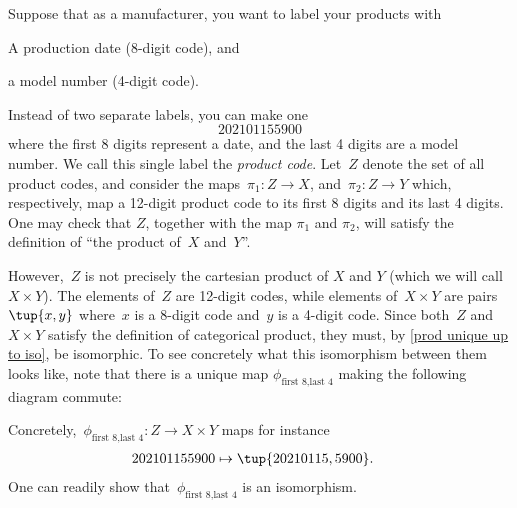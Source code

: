 \begin{example}
    \label{ex univ prop prod}
    Suppose that as a manufacturer, you want to label your products with
    \begin{compactitem}
        \item A production date (8-digit code), and
        \item a model number (4-digit code).
    \end{compactitem}
    Instead of two separate labels, you can make one
    \begin{equation*}
        202101155900
    \end{equation*}
    where the first 8 digits represent a date, and the last 4 digits are a model number.
    We call this single label the \emph{product code}. Let~$Z$ denote the set of all product codes, and consider the maps~$\pi_1\colon Z\to X$, and~$\pi_2\colon Z\to Y$ which, respectively, map a 12-digit product code to its first 8 digits and its last 4 digits. One may check that $Z$, together with the map $\pi_1$ and $\pi_2$, will satisfy the definition of ``the product of~$X$ and~$Y$''.


    \begin{center}
    \end{center}

    However,~$Z$ is not precisely the cartesian product of $X$ and $Y$ (which we will call $X\times Y$). The elements of~$Z$ are 12-digit codes, while elements of~$X\times Y$ are pairs~$\tup{x,y}$ where~$x$ is a 8-digit code and~$y$ is a 4-digit code. Since both~$Z$ and~$X\times Y$ satisfy the definition of categorical product, they must, by \cref{prod unique up to iso}, be isomorphic.
    To see concretely what this isomorphism between them looks like, note that there is a unique map $\phi_{\text{first 8},\text{last 4}}$ making the following diagram commute:
    \begin{center}
    \end{center}
    Concretely,~$\phi_{\text{first 8},\text{last 4}}: Z \to X\times Y$ maps for instance
    \begin{equation*}
        \begin{aligned}
            202101155900&\mapsto \tup{20210115,5900}.
        \end{aligned}
    \end{equation*}
    One can readily show that~$\phi_{\text{first 8},\text{last 4}}$ is an isomorphism.
\end{example}

